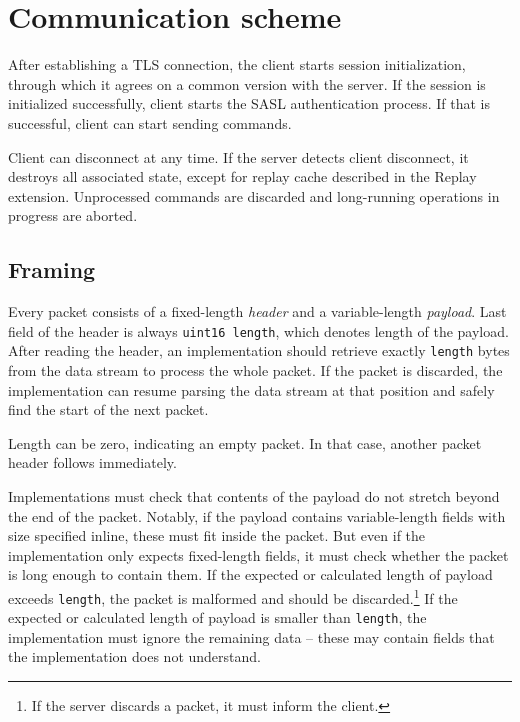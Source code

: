 
\section{Communication scheme}

After establishing a TLS connection, the client starts session initialization, through which it
agrees on a common version with the server. If the session is initialized successfully, client starts the
SASL authentication process. If that is successful, client can start sending commands.

Client can disconnect at any time. If the server detects client disconnect, it destroys all associated state,
except for replay cache described in the Replay extension. Unprocessed commands are discarded and long-running
operations in progress are aborted.

%

\subsection{Framing}

Every packet consists of a fixed-length {\it header} and a variable-length {\it payload}. Last field of the
header is always {\tt uint16 length}, which denotes length of the payload. After reading the header, an
implementation should retrieve exactly {\tt length} bytes from the data stream to process the whole packet. If
the packet is discarded, the implementation can resume parsing the data stream at that position and safely
find the start of the next packet.

Length can be zero, indicating an empty packet. In that case, another packet header follows immediately.

Implementations must check that contents of the payload do not stretch beyond the end of the packet. Notably,
if the payload contains variable-length fields with size specified inline, these must fit inside the packet.
But even if the implementation only expects fixed-length fields, it must check whether the packet is long
enough to contain them. If the expected or calculated length of payload exceeds {\tt length}, the packet is
malformed and should be discarded.\footnote{If the server discards a packet, it must inform the client.} If
the expected or calculated length of payload is smaller than {\tt length}, the implementation must ignore the
remaining data -- these may contain fields that the implementation does not understand.

